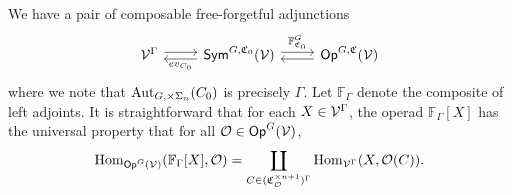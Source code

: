 \documentclass[a4paper,10pt
,draft
]{article}%
\renewcommand{\1}{\eta}%
\begin{document}
We have a pair of composable free-forgetful adjunctions
\[
      \begin{tikzcd}
            \V^\Gamma \arrow[r, shift left]
            &
            \Sym^{G, \mathfrak C_0}(\V) \arrow[l, shift left, "ev_{C_0}"] \arrow[r, shift left, "\mathbb F^G_{\mathfrak C_0}"]
            &
            \Op^{G, \mathfrak C}(\V) \arrow[l, shift left]
      \end{tikzcd}
\]
where we note that $\operatorname{Aut}_{G, \times \Sigma_n}(C_0)$ is precisely $\Gamma$.
Let $\mathbb F_\Gamma$ denote the composite of left adjoints.
It is straightforward that for each $X \in \mathcal V^\Gamma$,
the operad $\mathbb F_\Gamma[X]$ has the universal property that for all $\mathcal{O} \in \mathsf{Op}^G(\mathcal V)$,
\begin{equation}
      \operatorname{Hom}_{\mathsf{Op}^G(\mathcal V)}(\mathbb F_\Gamma[X], \mathcal{O}) = \mathop\coprod\limits_{C \in (\mathfrak C_{\mathcal{O}}^{\times n+1})^\Gamma}\operatorname{Hom}_{\mathcal V^\Gamma}(X, \mathcal{O}(C)).
\end{equation}
\end{document}
